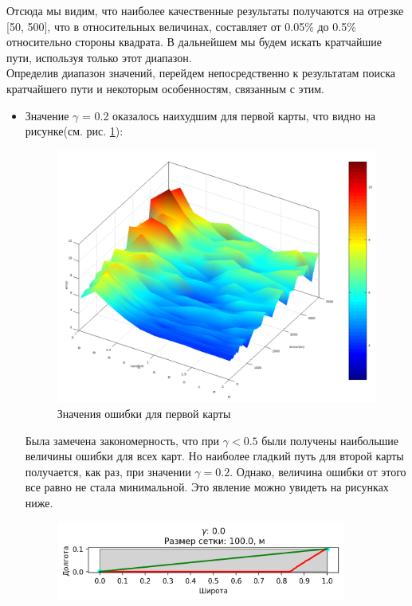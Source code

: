 \vspace{2mm}
Отсюда мы видим, что наиболее качественные результаты получаются
на отрезке [50, 500], что в относительных величинах, составляет от 0.05\% до
0.5\% относительно стороны квадрата. В дальнейшем мы будем искать
кратчайшие пути, используя только этот диапазон.\\
Определив диапазон значений, перейдем непосредственно к результатам
поиска кратчайшего пути и некоторым особенностям, связанным с этим.
\begin{itemize}
\item{
Значение $\gamma$ = 0.2 оказалось наихудшим для первой карты, что видно на
рисунке(см. рис. \ref{pic:error_first}):
\begin{figure}[H]
	\includegraphics[width=\textwidth]{images/3_8.png}
	\caption{Значения ошибки для первой карты}
	\label{pic:error_first}
\end{figure}
\vspace{2mm}
Была замечена закономерность, что при $\gamma < 0.5$ были получены
наибольшие величины ошибки для всех карт. Но наиболее гладкий
путь для второй карты получается, как раз, при значении $\gamma = 0.2$.
Однако, величина ошибки от этого все равно не стала минимальной.
Это явление можно увидеть на рисунках ниже.
\begin{figure}[H]
	\includegraphics[width=0.9\textwidth]{images/3_9.png}

\end{figure}}
\end{itemize}
